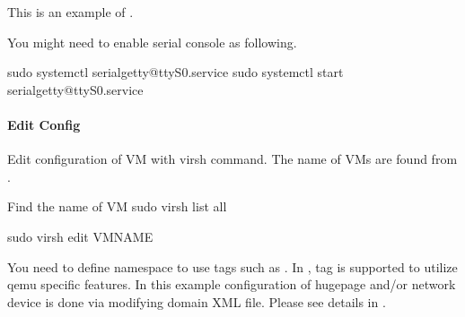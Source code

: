 \documentclass[a4paper,11pt,openany,oneside,english]{sphinxmanual}
\begin{document}
This is an example of .

\begin{sphinxVerbatim}[commandchars=\\\{\},formatcom=\footnotesize]
\end{sphinxVerbatim}

You might need to enable serial console as following.

\begin{sphinxVerbatim}[commandchars=\\\{\},formatcom=\footnotesize]
sudo systemctl  serial\PYGZhy{}getty@ttyS0.service
sudo systemctl start serial\PYGZhy{}getty@ttyS0.service
\end{sphinxVerbatim}


\paragraph{Edit Config}
\label{\detokenize{gsg/howto_use:edit-config}}
Edit configuration of VM with virsh command. The name of VMs are found from
.

\begin{sphinxVerbatim}[commandchars=\\\{\},formatcom=\footnotesize]
 Find the name of VM
 sudo virsh list \PYGZhy{}\PYGZhy{}all

 sudo virsh edit VM\PYGZus{}NAME
\end{sphinxVerbatim}

You need to define namespace  to use tags such as
.
In ,  tag is supported to utilize qemu specific
features. In this example configuration of hugepage and/or network device is
done via modifying domain XML file.
Please see details in
.
\end{document}
